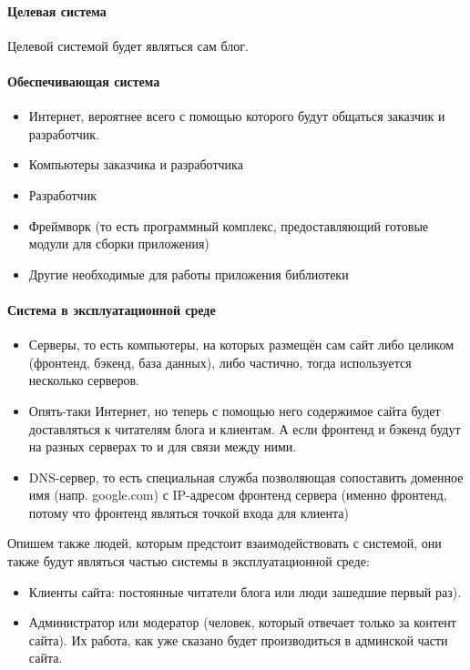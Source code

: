 \documentclass[bibliography=totocnumbered]{scrartcl}
\begin{document}
\paragraph{Целевая система}
Целевой системой будет являться сам блог.

\paragraph{Обеспечивающая система}
\begin{itemize}
    \item Интернет, вероятнее всего с помощью которого будут общаться заказчик и разработчик.
    \item Компьютеры заказчика и разработчика
    \item Разработчик
    \item Фреймворк (то есть программный комплекс, предоставляющий готовые модули для сборки приложения)
    \item Другие необходимые для работы приложения библиотеки
\end{itemize}

\paragraph{Система в эксплуатационной среде}

\begin{itemize}
    \item Серверы, то есть компьютеры, на которых размещён сам сайт либо целиком (фронтенд, бэкенд, база данных), либо частично, тогда используется несколько серверов.

    \item Опять-таки Интернет, но теперь с помощью него содержимое сайта будет доставляться к читателям блога и клиентам. А если фронтенд и бэкенд будут на разных серверах то и для связи между ними.

    \item DNS-сервер, то есть специальная служба позволяющая сопоставить доменное имя (напр. google.com) с IP-адресом фронтенд сервера (именно фронтенд, потому что фронтенд являться точкой входа для клиента)
    
\end{itemize}

Опишем также людей, которым предстоит взаимодействовать с системой, они также будут являться частью системы в эксплуатационной среде:
\begin{itemize}
    \item Клиенты сайта: постоянные читатели блога или люди зашедшие первый раз).
    \item Администратор или модератор (человек, который отвечает только за контент сайта). Их работа, как уже сказано будет производиться в админской части сайта.
\end{itemize}
\end{document}
